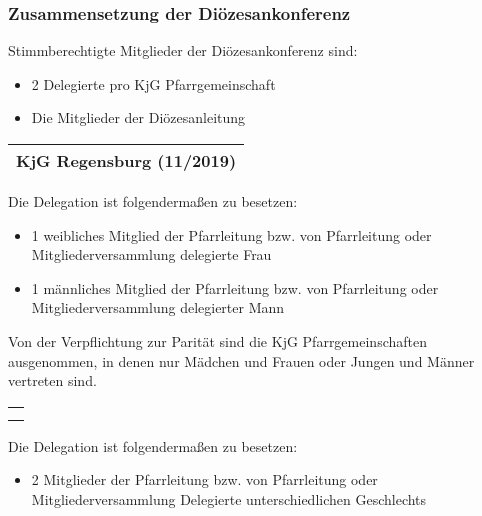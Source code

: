 \documentclass[12pt]{report}
\newcounter{tablecounter}
\newcommand\showcounter{\addtocounter{tablecounter}{1}\thetablecounter}
\begin{document}
\begin{flushleft}
\subsubsection{Zusammensetzung der Diözesankonferenz}
Stimmberechtigte Mitglieder der Diözesankonferenz sind:
\begin{itemize}
  \item 2 Delegierte pro KjG Pfarrgemeinschaft
  \item Die Mitglieder der Diözesanleitung
\end{itemize}

\begin{table}[H]
 \begin{tabular}{|l|}
  \hline
  \rowcolor[HTML]{FFCC67} 
  \rule[-1ex]{0pt}{4ex} \textbf{KjG Regensburg (11/2019)}     \hspace{0.6\textwidth} \showcounter        \\ \hline
 \end{tabular}
\end{table}

Die Delegation ist folgendermaßen zu besetzen:
\begin{itemize}
  \item 1 weibliches Mitglied der Pfarrleitung bzw. von Pfarrleitung oder Mitgliederversammlung
        delegierte Frau
  \item 1 männliches Mitglied der Pfarrleitung bzw. von Pfarrleitung oder Mitgliederversammlung
        delegierter Mann
\end{itemize}

Von der Verpflichtung zur Parität sind die KjG Pfarrgemeinschaften ausgenommen, in denen nur
Mädchen und Frauen oder Jungen und Männer vertreten sind.

\begin{table}[H]
 \begin{tabular}{|l|}
  \hline
  \rowcolor[HTML]{9AFF99} 
  \rule[-1ex]{0pt}{4ex}
  \begin{minipage}[t]{\textwidth}
   \textbf{Änderung:\\}  
    \end{minipage}
  \\ \hline
 \end{tabular}
\end{table}

Die Delegation ist folgendermaßen zu besetzen:
\begin{itemize}
  \item{\color{red} 2 Mitglieder der Pfarrleitung bzw. von Pfarrleitung oder Mitgliederversammlung
        Delegierte unterschiedlichen Geschlechts}
\end{itemize}


\end{flushleft}
\end{document}

